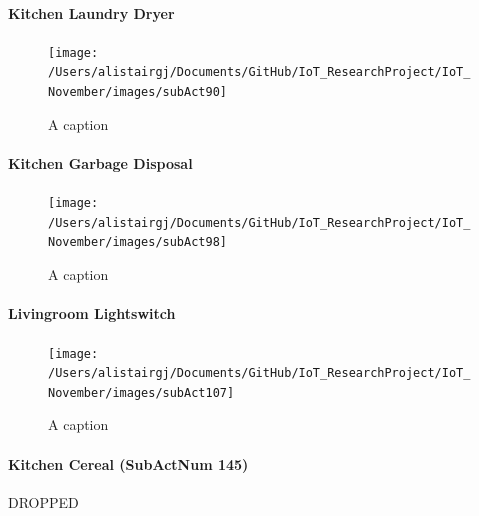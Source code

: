 \documentclass[11pt,]{article}
\let\oldparagraph\paragraph
\renewcommand{\paragraph}[1]{\oldparagraph{#1}\mbox{}}
\begin{document}
\hypertarget{kitchen-laundry-dryer}{%
\paragraph{Kitchen Laundry Dryer}\label{kitchen-laundry-dryer}}

\begin{figure}[H]

{\centering \texttt{[image: /Users/alistairgj/Documents/GitHub/IoT\_ResearchProject/IoT\_November/images/subAct90]} 

}

\caption{A caption}\label{fig:subAct90}
\end{figure}

\hypertarget{kitchen-garbage-disposal}{%
\paragraph{Kitchen Garbage Disposal}\label{kitchen-garbage-disposal}}

\begin{figure}[H]

{\centering \texttt{[image: /Users/alistairgj/Documents/GitHub/IoT\_ResearchProject/IoT\_November/images/subAct98]} 

}

\caption{A caption}\label{fig:subAct98}
\end{figure}

\hypertarget{livingroom-lightswitch}{%
\paragraph{Livingroom Lightswitch}\label{livingroom-lightswitch}}

\begin{figure}[H]

{\centering \texttt{[image: /Users/alistairgj/Documents/GitHub/IoT\_ResearchProject/IoT\_November/images/subAct107]} 

}

\caption{A caption}\label{fig:subAct107}
\end{figure}

\hypertarget{kitchen-cereal-subactnum-145}{%
\paragraph{Kitchen Cereal (SubActNum
145)}\label{kitchen-cereal-subactnum-145}}

DROPPED
\end{document}
